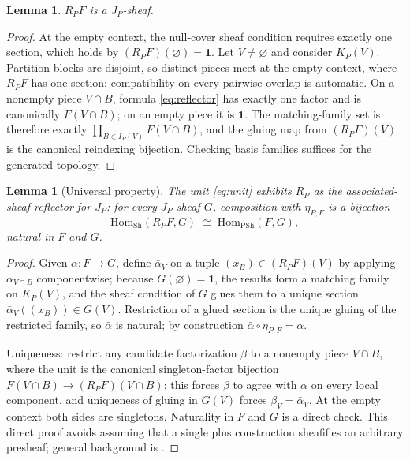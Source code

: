 \documentclass[11pt]{amsart}
\newtheorem{lemma}[theorem]{Lemma}
\theoremstyle{definition}
\theoremstyle{remark}
\newcommand{\PSh}{\mathrm{PSh}}
\newcommand{\Sh}{\mathrm{Sh}}
\newcommand{\Hom}{\mathrm{Hom}}
\begin{document}
\begin{lemma}\label{lem:sheafness}
$R_PF$ is a $J_P$-sheaf.
\end{lemma}

\begin{proof}
At the empty context, the null-cover sheaf condition requires exactly one section, which holds by $(R_PF)(\varnothing)=\mathbf{1}$. Let $V\neq\varnothing$ and consider $K_P(V)$. Partition blocks are disjoint, so distinct pieces meet at the empty context, where $R_PF$ has one section: compatibility on every pairwise overlap is automatic. On a nonempty piece $V\cap B$, formula \eqref{eq:reflector} has exactly one factor and is canonically $F(V\cap B)$; on an empty piece it is $\mathbf{1}$. The matching-family set is therefore exactly $\prod_{B\in I_P(V)}F(V\cap B)$, and the gluing map from $(R_PF)(V)$ is the canonical reindexing bijection. Checking basis families suffices for the generated topology.
\end{proof}

\begin{lemma}[Universal property]\label{lem:universal}
The unit \eqref{eq:unit} exhibits $R_P$ as the associated-sheaf reflector for $J_P$: for every $J_P$-sheaf $G$, composition with $\eta_{P,F}$ is a bijection
\[
\Hom_{\Sh}(R_PF,G)\;\cong\;\Hom_{\PSh}(F,G),
\]
natural in $F$ and $G$.
\end{lemma}

\begin{proof}
Given $\alpha:F\to G$, define $\bar\alpha_V$ on a tuple $(x_B)\in(R_PF)(V)$ by applying $\alpha_{V\cap B}$ componentwise; because $G(\varnothing)=\mathbf{1}$, the results form a matching family on $K_P(V)$, and the sheaf condition of $G$ glues them to a unique section $\bar\alpha_V((x_B))\in G(V)$. Restriction of a glued section is the unique gluing of the restricted family, so $\bar\alpha$ is natural; by construction $\bar\alpha\circ\eta_{P,F}=\alpha$.

Uniqueness: restrict any candidate factorization $\beta$ to a nonempty piece $V\cap B$, where the unit is the canonical singleton-factor bijection $F(V\cap B)\to(R_PF)(V\cap B)$; this forces $\beta$ to agree with $\alpha$ on every local component, and uniqueness of gluing in $G(V)$ forces $\beta_V=\bar\alpha_V$. At the empty context both sides are singletons. Naturality in $F$ and $G$ is a direct check. This direct proof avoids assuming that a single plus construction sheafifies an arbitrary presheaf; general background is \cite[Thm.~7.10.10, Prop.~7.10.12]{stacks00W1}.
\end{proof}
\end{document}
